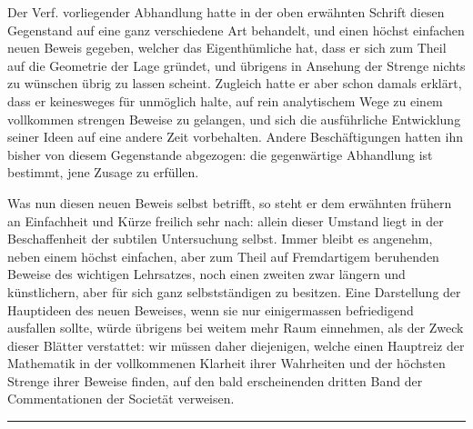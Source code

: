 Der Verf. vorliegender Abhandlung hatte in der oben erwähnten Schrift
diesen Gegenstand auf eine ganz verschiedene Art behandelt, und
einen höchst einfachen neuen Beweis gegeben, welcher das
Eigenthümliche hat, dass er sich zum Theil auf die Geometrie der Lage
gründet, und übrigens in Ansehung der Strenge nichts zu wünschen übrig
zu lassen scheint. Zugleich hatte er aber schon damals erklärt, dass
er keinesweges für unmöglich halte, auf rein analytischem Wege zu
einem vollkommen strengen Beweise zu gelangen, und sich die
ausführliche Entwicklung seiner Ideen auf eine andere Zeit
vorbehalten. Andere Beschäftigungen hatten ihn bisher von diesem
Gegenstande abgezogen: die gegenwärtige Abhandlung ist bestimmt,
jene Zusage zu erfüllen.

Was nun diesen neuen Beweis selbst betrifft, so steht er dem erwähnten
frühern an Einfachheit und Kürze freilich sehr nach: allein dieser
Umstand liegt in der Beschaffenheit der subtilen Untersuchung selbst.
Immer bleibt es angenehm, neben einem höchst einfachen, aber zum
Theil auf Fremdartigem beruhenden Beweise des wichtigen Lehrsatzes,
noch einen zweiten zwar längern und künstlichern, aber für sich ganz
selbstständigen zu besitzen. Eine Darstellung der Hauptideen des neuen
Beweises, wenn sie nur einigermassen befriedigend ausfallen sollte,
würde übrigens bei weitem mehr Raum einnehmen, als der Zweck dieser
Blätter verstattet: wir müssen daher diejenigen, welche einen
Hauptreiz der Mathematik in der vollkommenen Klarheit ihrer Wahrheiten
und der höchsten Strenge ihrer Beweise finden, auf den bald
erscheinenden dritten Band der Commentationen der Societät verweisen.
\begin{center}\rule{0.28\linewidth}{0.4pt}\end{center}
